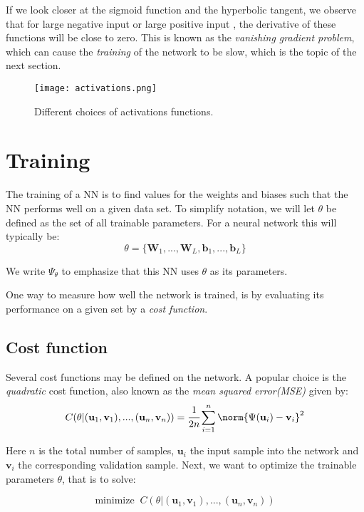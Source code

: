If we look closer at the sigmoid function and the hyperbolic tangent, we observe that for large negative input or large positive input , the derivative of these functions will be close to zero. This is known as the \emph{vanishing gradient problem}, which can cause the \emph{training} of the network to be slow, which is the topic of the next section.

\begin{figure}
\centerline{\texttt{[image: activations.png]}}
\caption{Different choices of activations functions.}
\end{figure}

 
\section{Training}

The training of a NN is to find values for the weights and biases such that the NN performs well on a given data set. To simplify notation, we will let $\theta$ be defined as the set of all trainable parameters. For a neural network this will typically be:
\begin{equation*}
\theta = \big\{\mathbf{W}_1,...,\mathbf{W}_L, \mathbf{b}_1,..., \mathbf{b}_L\big\}
\end{equation*}

We write $\Psi_\theta$ to emphasize that this NN uses $\theta$ as its parameters.


One way to measure how well the network is trained, is by evaluating its performance on a given set by a \emph{cost function}.
\subsection{Cost function}
Several cost functions may be defined on the network. A popular choice is the \emph{quadratic} cost function, also known as the \emph{mean squared error(MSE)} given by:
\begin{equation}
C(  \theta  |   (\mathbf{u}_1,\mathbf{v}_1),...,(\mathbf{u}_n,\mathbf{v}_n)) = \cfrac{1}{2n}\sum_{i=1}^{n}\norm{\Psi(\mathbf{u}_i)-\mathbf{v}_i}^2
\end{equation}

Here $n$ is the total number of samples, $\mathbf{u}_i$ the input sample into the network and $\mathbf{v}_i$ the corresponding validation sample. Next, we want to optimize the trainable parameters $\theta$, that is to solve: 

\begin{equation}
\text{minimize } \ C(\theta | (\mathbf{u}_1,\mathbf{v}_1),...,(\mathbf{u}_n,\mathbf{v}_n))
\end{equation}

